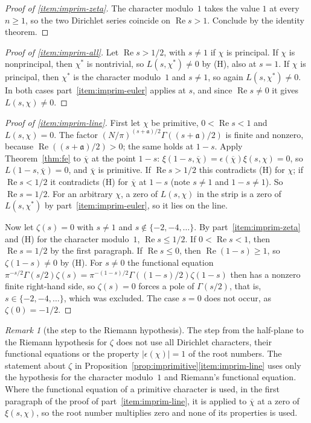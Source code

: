 \documentclass[11pt]{amsbook}
\theoremstyle{plain}
\theoremstyle{definition}
\theoremstyle{remark}
\newtheorem{remark}[theorem]{Remark}
\numberwithin{equation}{section}
\numberwithin{figure}{chapter}
\numberwithin{table}{chapter}
\begin{document}
\begin{proof}[Proof of \ref{item:imprim-zeta}]
The character modulo~$1$ takes the value $1$ at every $n\ge1$, so the
two Dirichlet series coincide on $\operatorname{Re}s>1$. Conclude by
the identity theorem.
\end{proof}

\begin{proof}[Proof of \ref{item:imprim-all}]
Let $\operatorname{Re}s>1/2$, with $s\ne1$ if $\chi$ is principal. If
$\chi$ is nonprincipal, then $\chi^*$ is nontrivial, so
$L(s,\chi^*)\ne0$ by (H), also at $s=1$. If $\chi$ is principal, then
$\chi^*$ is the character modulo~$1$ and $s\ne1$, so again
$L(s,\chi^*)\ne0$. In both cases part~\ref{item:imprim-euler} applies
at $s$, and since $\operatorname{Re}s\ne0$ it gives $L(s,\chi)\ne0$.
\end{proof}

\begin{proof}[Proof of \ref{item:imprim-line}]
First let $\chi$ be primitive, $0<\operatorname{Re}s<1$ and
$L(s,\chi)=0$. The factor $(N/\pi)^{(s+\mathfrak a)/2}
\Gamma((s+\mathfrak a)/2)$ is finite and nonzero, because
$\operatorname{Re}((s+\mathfrak a)/2)>0$; the same holds at $1-s$.
Apply Theorem~\ref{thm:fe} to $\overline\chi$ at the point $1-s$:
$\xi(1-s,\overline\chi)=\epsilon(\overline\chi)\xi(s,\chi)=0$, so
$L(1-s,\overline\chi)=0$, and $\overline\chi$ is primitive. If
$\operatorname{Re}s>1/2$ this contradicts (H) for $\chi$; if
$\operatorname{Re}s<1/2$ it contradicts (H) for $\overline\chi$ at
$1-s$ (note $s\ne1$ and $1-s\ne1$). So $\operatorname{Re}s=1/2$. For
an arbitrary $\chi$, a zero of $L(s,\chi)$ in the strip is a zero of
$L(s,\chi^*)$ by part~\ref{item:imprim-euler}, so it lies on the line.

Now let $\zeta(s)=0$ with $s\ne1$ and $s\notin\{-2,-4,\dots\}$. By
part~\ref{item:imprim-zeta} and (H) for the character modulo~$1$,
$\operatorname{Re}s\le1/2$. If $0<\operatorname{Re}s<1$, then
$\operatorname{Re}s=1/2$ by the first paragraph. If
$\operatorname{Re}s\le0$, then $\operatorname{Re}(1-s)\ge1$, so
$\zeta(1-s)\ne0$ by (H). For $s\ne0$ the functional equation
$\pi^{-s/2}\Gamma(s/2)\zeta(s)=\pi^{-(1-s)/2}\Gamma((1-s)/2)
\zeta(1-s)$ then has a nonzero finite right-hand side, so
$\zeta(s)=0$ forces a pole of $\Gamma(s/2)$, that is,
$s\in\{-2,-4,\dots\}$, which was excluded. The case $s=0$ does not
occur, as $\zeta(0)=-1/2$.
\end{proof}

\begin{remark}[the step to the Riemann hypothesis]
\label{rem:zeta-suffices}
The step from the half-plane to the Riemann hypothesis for $\zeta$
does not use all Dirichlet characters, their functional equations or
the property $|\epsilon(\chi)|=1$ of the root numbers. The statement
about $\zeta$ in
Proposition~\ref{prop:imprimitive}\ref{item:imprim-line} uses only the
hypothesis for the character modulo~$1$ and Riemann's functional
equation. Where the functional equation of a primitive character is
used, in the first paragraph of the proof of
part~\ref{item:imprim-line}, it is applied to $\overline\chi$ at a
zero of $\xi(s,\chi)$, so the root number multiplies zero and none of
its properties is used.
\end{remark}
\clearpage
\clearpage
\end{document}
